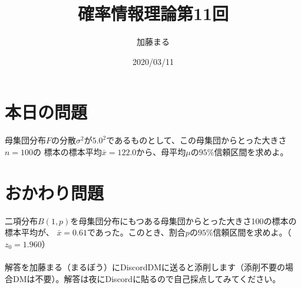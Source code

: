 \documentclass[a4j,uplatex,dvipdfmx]{jsarticle}
\title{確率情報理論第11回}
\author{加藤まる}
\date{2020/03/11}
\begin{document}
\maketitle

\section*{本日の問題}
母集団分布$F$の分散$\sigma ^2$が$5.0^2$であるものとして、この母集団からとった大きさ$n=100$の
標本の標本平均$\bar{x}=122.0$から、母平均$\mu$の$95\%$信頼区間を求めよ。


\section*{おかわり問題}
二項分布$B(1,p)$を母集団分布にもつある母集団からとった大きさ100の標本の標本平均が、
$\bar{x}=0.61$であった。このとき、割合$p$の$95 \%$信頼区間を求めよ。（$z_0 =1.960$）\\
\\
解答を加藤まる（まるぼう）にDiscordDMに送ると添削します（添削不要の場合DMは不要）。解答は夜にDiscordに貼るので自己採点してみてください。
\end{document}
